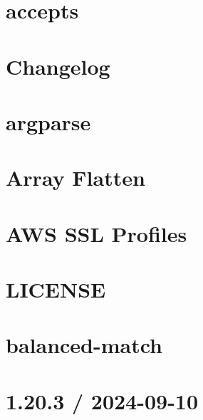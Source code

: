 \documentclass[twoside]{book}
\newcommand{\+}{\discretionary{\mbox{\scriptsize$\hookleftarrow$}}{}{}}
\begin{document}
\chapter{accepts}
\label{md_src_nodejs_node_modules_accepts_README}

\chapter{Changelog}
\label{md_src_nodejs_node_modules_argparse_CHANGELOG}

\chapter{argparse}
\label{md_src_nodejs_node_modules_argparse_README}

\chapter{Array Flatten}
\label{md_src_nodejs_node_modules_array_flatten_README}

\chapter{AWS SSL Profiles}
\label{md_src_nodejs_node_modules_aws_ssl_profiles_README}

\chapter{LICENSE}
\label{md_src_nodejs_node_modules_balanced_match_LICENSE}

\chapter{balanced-\/match}
\label{md_src_nodejs_node_modules_balanced_match_README}

\chapter{1.20.3 / 2024-\/09-\/10}
\label{md_src_nodejs_node_modules_body_parser_HISTORY}

\end{document}
